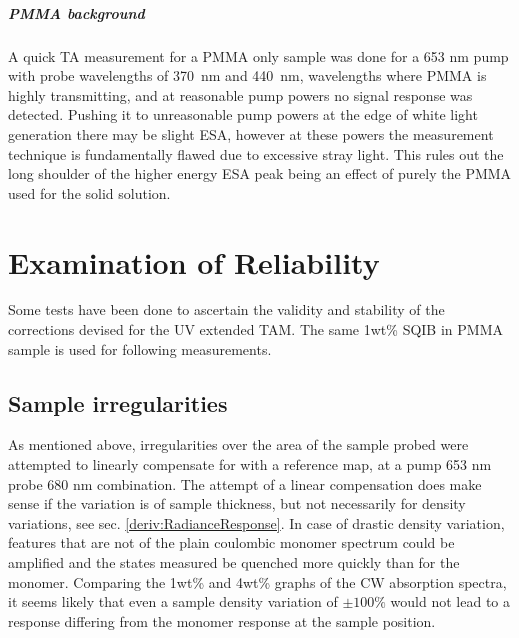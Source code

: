 \documentclass[twoside,openright,listof=numbered]{scrreprt}
\begin{document}
\paragraph{PMMA background}
A quick TA measurement for a PMMA only sample was done for a 653 nm pump with probe wavelengths of \SI{370}{\nano\meter} and \SI{440}{\nano\meter},  wavelengths where PMMA is highly transmitting, and at reasonable pump powers no signal response was detected. Pushing it to unreasonable pump powers at the edge of white light generation there may be slight ESA, however at these powers the measurement technique is fundamentally flawed due to excessive stray light. This rules out the long shoulder of the higher energy ESA peak being an effect of purely the PMMA used for the solid solution.




\chapter{Examination of Reliability}\label{chpt:reliability}
Some tests have been done to ascertain the validity and stability of the corrections devised for the UV extended TAM. The same 1wt\% SQIB in PMMA sample is used for following measurements.
\section{Sample irregularities}
As mentioned above, irregularities over the area of the sample probed were attempted to linearly compensate for with a reference map, at a pump 653 nm probe 680 nm combination. The attempt of a linear compensation does make sense if the variation is of sample thickness, but not necessarily for density variations, see sec. \ref{deriv:RadianceResponse}. In case of drastic density variation, features that are not of the plain coulombic monomer spectrum could be amplified and the states measured be quenched more quickly than for the monomer. Comparing the 1wt\% and 4wt\% graphs of the CW absorption spectra, it seems likely that even a sample density variation of $\pm100\%$ would not lead to a response differing from the monomer response at the sample position.
\end{document}
